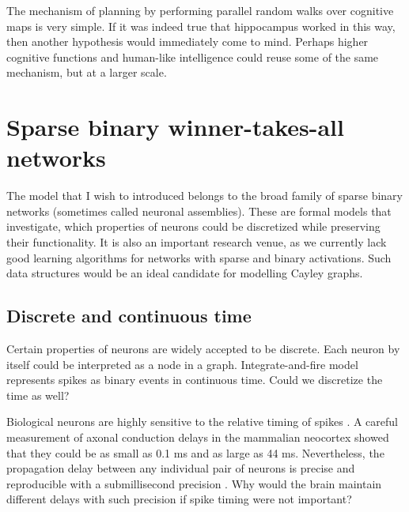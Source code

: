 \documentclass[12pt]{article}
\begin{document}
The mechanism of planning by performing parallel random walks over cognitive maps is very simple. If it was indeed true that hippocampus worked in this way, then another hypothesis would immediately come to mind. Perhaps higher cognitive functions and human-like intelligence could reuse some of the same mechanism, but at a larger scale. 


\section{Sparse binary winner-takes-all networks}

The model that I wish to introduced belongs to the broad family of sparse binary networks (sometimes called neuronal assemblies). These are formal models that investigate, which properties of neurons could be discretized while preserving their functionality. It is also an important research venue, as we currently lack good learning algorithms for networks with sparse and binary activations. Such data structures would be an ideal candidate for modelling Cayley graphs. 

\subsection{Discrete and continuous time}

Certain properties of neurons are widely accepted to be discrete. Each neuron by itself could be interpreted as a node in a graph. Integrate-and-fire model represents spikes as binary events in continuous time. Could we discretize the time as well?

Biological neurons are highly sensitive to the relative timing of spikes \cite{lindsey,prut,villa,tetko}. A careful measurement of axonal conduction delays in the
mammalian neocortex \cite{Swadlow1985,Swadlow1988,Swadlow1992} showed that they could
be as small as 0.1 ms and as large as 44 ms. Nevertheless, the propagation delay
between any individual pair of neurons is precise and reproducible with a
submillisecond precision \cite{Swadlow1985,Swadlow1994}. Why would
the brain maintain different delays with such precision if spike timing were
not important? 
\end{document}
